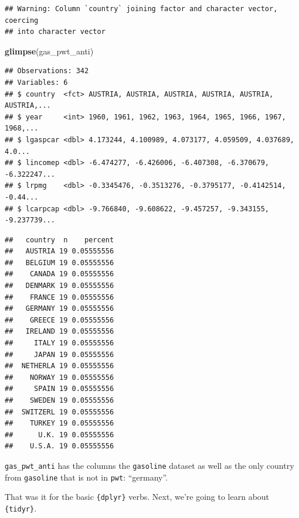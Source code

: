 \documentclass[]{gitbook}
\newenvironment{Shaded}{\begin{snugshade}}{\end{snugshade}}
\newcommand{\KeywordTok}[1]{\textcolor[rgb]{0.13,0.29,0.53}{\textbf{#1}}}
\newcommand{\NormalTok}[1]{#1}
\newcommand{\OperatorTok}[1]{\textcolor[rgb]{0.81,0.36,0.00}{\textbf{#1}}}
\newcommand{\StringTok}[1]{\textcolor[rgb]{0.31,0.60,0.02}{#1}}
\begin{document}
\begin{verbatim}
## Warning: Column `country` joining factor and character vector, coercing
## into character vector
\end{verbatim}

\begin{Shaded}
\begin{Highlighting}[]
\KeywordTok{glimpse}\NormalTok{(gas_pwt_anti)}
\end{Highlighting}
\end{Shaded}

\begin{verbatim}
## Observations: 342
## Variables: 6
## $ country  <fct> AUSTRIA, AUSTRIA, AUSTRIA, AUSTRIA, AUSTRIA, AUSTRIA,...
## $ year     <int> 1960, 1961, 1962, 1963, 1964, 1965, 1966, 1967, 1968,...
## $ lgaspcar <dbl> 4.173244, 4.100989, 4.073177, 4.059509, 4.037689, 4.0...
## $ lincomep <dbl> -6.474277, -6.426006, -6.407308, -6.370679, -6.322247...
## $ lrpmg    <dbl> -0.3345476, -0.3513276, -0.3795177, -0.4142514, -0.44...
## $ lcarpcap <dbl> -9.766840, -9.608622, -9.457257, -9.343155, -9.237739...
\end{verbatim}

\begin{Shaded}
\end{Shaded}

\begin{verbatim}
##   country  n    percent
##   AUSTRIA 19 0.05555556
##   BELGIUM 19 0.05555556
##    CANADA 19 0.05555556
##   DENMARK 19 0.05555556
##    FRANCE 19 0.05555556
##   GERMANY 19 0.05555556
##    GREECE 19 0.05555556
##   IRELAND 19 0.05555556
##     ITALY 19 0.05555556
##     JAPAN 19 0.05555556
##  NETHERLA 19 0.05555556
##    NORWAY 19 0.05555556
##     SPAIN 19 0.05555556
##    SWEDEN 19 0.05555556
##  SWITZERL 19 0.05555556
##    TURKEY 19 0.05555556
##      U.K. 19 0.05555556
##    U.S.A. 19 0.05555556
\end{verbatim}

\texttt{gas\_pwt\_anti} has the columns the \texttt{gasoline} dataset as well as the only country from \texttt{gasoline}
that is not in \texttt{pwt}: ``germany''.

That was it for the basic \texttt{\{dplyr\}} verbs. Next, we're going to learn about \texttt{\{tidyr\}}.
\end{document}
